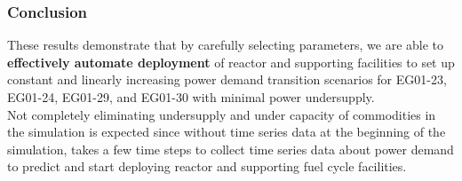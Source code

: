 \begin{frame}
\frametitle{Conclusion}
These results demonstrate that by carefully selecting \deploy 
parameters, we are able to \textbf{effectively automate deployment}
of reactor and supporting facilities to set up 
constant and linearly increasing power demand transition scenarios
for EG01-23, EG01-24, EG01-29, and EG01-30 with minimal 
power undersupply. 
\vspace{1em}
\\
Not completely eliminating undersupply and under capacity of 
commodities in the simulation is expected 
since without time series data 
at the beginning of the simulation, \deploy takes a few 
time steps to collect time series data about power demand 
to predict and start deploying reactor and supporting 
fuel cycle facilities. 

\end{frame}
